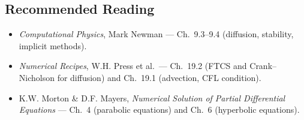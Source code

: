 \subsection*{Recommended Reading}
\begin{itemize}
  \item \textit{Computational Physics}, Mark Newman --- Ch.\ 9.3--9.4
    (diffusion, stability, implicit methods).
  \item \textit{Numerical Recipes}, W.H. Press et al.\ --- Ch.\ 19.2
    (FTCS and Crank--Nicholson for diffusion) and Ch.\ 19.1
    (advection, CFL condition).
  \item K.W. Morton \& D.F. Mayers, \textit{Numerical Solution of
    Partial Differential Equations} --- Ch.\ 4 (parabolic equations)
    and Ch.\ 6 (hyperbolic equations).
\end{itemize}
